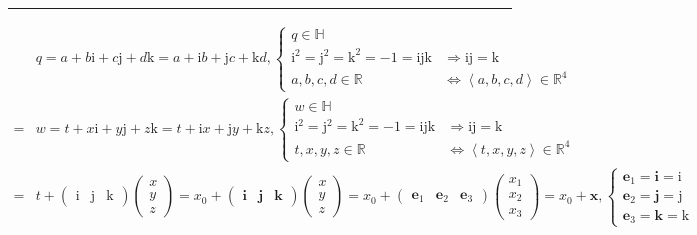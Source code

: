 \documentclass[
]{book}
\theoremstyle{definition}
\theoremstyle{definition}
\theoremstyle{definition}
\theoremstyle{definition}
\theoremstyle{remark}
\begin{document}
\begin{center}\rule{0.5\linewidth}{0.5pt}\end{center}

\[
\begin{aligned}
 & q=a+b\mathrm{i}+c\mathrm{j}+d\mathrm{k}=a+\mathrm{i}b+\mathrm{j}c+\mathrm{k}d,\begin{cases}
q\in\mathbb{H}\\
\mathrm{i}^{2}=\mathrm{j}^{2}=\mathrm{k}^{2}=-1=\mathrm{i}\mathrm{j}\mathrm{k} & \Rightarrow\mathrm{i}\mathrm{j}=\mathrm{k}\\
a,b,c,d\in\mathbb{R} & \Leftrightarrow\left\langle a,b,c,d\right\rangle \in\mathbb{R}^{4}
\end{cases}\\
= & w=t+x\mathrm{i}+y\mathrm{j}+z\mathrm{k}=t+\mathrm{i}x+\mathrm{j}y+\mathrm{k}z,\begin{cases}
w\in\mathbb{H}\\
\mathrm{i}^{2}=\mathrm{j}^{2}=\mathrm{k}^{2}=-1=\mathrm{i}\mathrm{j}\mathrm{k} & \Rightarrow\mathrm{i}\mathrm{j}=\mathrm{k}\\
t,x,y,z\in\mathbb{R} & \Leftrightarrow\left\langle t,x,y,z\right\rangle \in\mathbb{R}^{4}
\end{cases}\\
= & t+\begin{pmatrix}\mathrm{i} & \mathrm{j} & \mathrm{k}\end{pmatrix}\begin{pmatrix}x\\
y\\
z
\end{pmatrix}=x_{{\scriptscriptstyle 0}}+\begin{pmatrix}\boldsymbol{i} & \boldsymbol{j} & \boldsymbol{k}\end{pmatrix}\begin{pmatrix}x\\
y\\
z
\end{pmatrix}=x_{{\scriptscriptstyle 0}}+\begin{pmatrix}\boldsymbol{e}_{{\scriptscriptstyle 1}} & \boldsymbol{e}_{{\scriptscriptstyle 2}} & \boldsymbol{e}_{{\scriptscriptstyle 3}}\end{pmatrix}\begin{pmatrix}x_{{\scriptscriptstyle 1}}\\
x_{{\scriptscriptstyle 2}}\\
x_{{\scriptscriptstyle 3}}
\end{pmatrix}=x_{{\scriptscriptstyle 0}}+\boldsymbol{x},\begin{cases}
\boldsymbol{e}_{{\scriptscriptstyle 1}}=\boldsymbol{i}=\mathrm{i}\\
\boldsymbol{e}_{{\scriptscriptstyle 2}}=\boldsymbol{j}=\mathrm{j}\\
\boldsymbol{e}_{{\scriptscriptstyle 3}}=\boldsymbol{k}=\mathrm{k}
\end{cases}
\end{aligned}
\]
\end{document}
